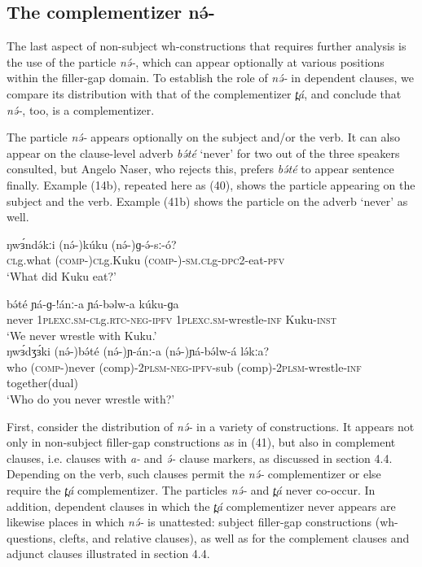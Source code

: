 \subsection{The complementizer nə́-}
The last aspect of non-subject wh-constructions that requires further analysis is the use of the particle \textit{nə́-}, which can appear optionally at various positions within the filler-gap domain. To establish the role of \textit{nə́-} in dependent clauses, we compare its distribution with that of the complementizer \textit{t̪á}, and conclude that \textit{nə́-}, too, is a complementizer.

The particle \textit{nə́-} appears optionally on the subject and/or the verb. It can also appear on the clause-level adverb \textit{bə́té} ‘never’ for two out of the three speakers consulted, but Angelo Naser, who rejects this, prefers \textit{bə́té} to appear sentence finally. Example (14b), repeated here as (40), shows the particle appearing on the subject and the verb.  Example (41b) shows the particle on the adverb ‘never’ as well.

\ea
\gll	ŋwɜ́ndə́kːi	(nə́-)kúku	(nə́-)ɡ-ə́-sː-ó?\\
	\textsc{cl}g.what	(\textsc{comp-})\textsc{cl}g.Kuku	(\textsc{comp-})-\textsc{sm.cl}g-\textsc{dpc}2-eat-\textsc{pfv}	\\
\trans	‘What did Kuku eat?’\\
\z

\ea
\ea \gll	bə́té	ɲá-ɡ-!ánː-a	ɲá-bəlw-a          	kúku-ɡa\\
	never   1\textsc{plexc.sm}-\textsc{cl}g.\textsc{rtc}-\textsc{neg}-\textsc{ipfv} 1\textsc{plexc.sm}-wrestle-\textsc{inf}	Kuku-\textsc{inst}\\
\trans		‘We never wrestle with Kuku.’\\
\ex \gll	ŋwɜ́dʒɜ́ki	(nə́-)bə́té	(nə́-)ɲ-ánː-a	 (nə́-)ɲá-bə́lw-á	lə́kːa?  	   \\
		    	who	        (\textsc{comp-})never     (comp)-2\textsc{plsm}-\textsc{neg}-\textsc{ipfv}-sub	
			(comp)-2\textsc{plsm}-wrestle-\textsc{inf}	together(dual)\\
\trans		‘Who do you never wrestle with?’
\z
\z

First, consider the distribution of \textit{nə́-} in a variety of constructions. It appears not only in non-subject filler-gap constructions as in (41), but also in complement clauses, i.e. clauses with \textit{a-} and \textit{ə́-} clause markers, as discussed in section 4.4.  Depending on the verb, such clauses permit the \textit{nə́-} complementizer or else require the \textit{t̪á} complementizer.  The particles \textit{nə́-} and \textit{t̪á} never co-occur.  In addition, dependent clauses in which the \textit{t̪á} complementizer never appears are likewise places in which \textit{nə́-} is unattested:  subject filler-gap constructions (wh-questions, clefts, and relative clauses), as well as for the complement clauses and adjunct clauses illustrated in section 4.4. 

